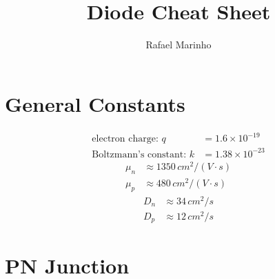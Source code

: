 \documentclass{article}
\title{Diode Cheat Sheet}
\author{Rafael Marinho}
\date{}
\begin{document}
\maketitle
\section*{General Constants}
\begin{multicols}{3}
\noindent
\begin{align*}
\mbox{electron charge: } q &= 1.6\times10^{-19}\\
\mbox{Boltzmann's constant: }k &= 1.38\times10^{-23}
\end{align*}
\begin{align*}
\mu_n &\approx 1350\,cm^2/(V\cdot s)\\
\mu_p &\approx 480\,cm^2/(V\cdot s)
\end{align*}
\begin{align*}
D_n &\approx 34\,cm^2/s\\
D_p &\approx 12\,cm^2/s
\end{align*}
\end{multicols}
\section*{PN Junction}
\end{document}
